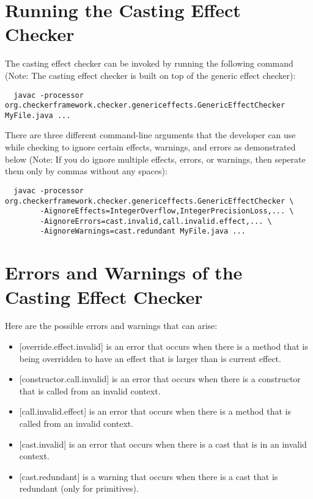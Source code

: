 \section{Running the Casting Effect Checker\label{castingeffect-running}}

The casting effect checker can be invoked by running the following command (Note: The casting effect checker is built on top of the generic effect checker):
\begin{Verbatim}
  javac -processor org.checkerframework.checker.genericeffects.GenericEffectChecker MyFile.java ...
\end{Verbatim}

There are three different command-line arguments that the developer can use while checking to ignore certain effects, warnings, and errors as demonstrated below (Note: If you do ignore multiple effects, errors, or warnings, then seperate them only by commas without any spaces):
\begin{Verbatim}
  javac -processor org.checkerframework.checker.genericeffects.GenericEffectChecker \
        -AignoreEffects=IntegerOverflow,IntegerPrecisionLoss,... \
        -AignoreErrors=cast.invalid,call.invalid.effect,... \
        -AignoreWarnings=cast.redundant MyFile.java ...
\end{Verbatim}

\section{Errors and Warnings of the Casting Effect Checker\label{castingeffect-errors}}

Here are the possible errors and warnings that can arise:
\begin{itemize}
\item
{[override.effect.invalid]} is an error that occurs when there is a method that is being overridden to have an effect that is larger than is current effect.
\item
{[constructor.call.invalid]} is an error that occurs when there is a constructor that is called from an invalid context.
\item
{[call.invalid.effect]} is an error that occurs when there is a method that is called from an invalid context.
\item
{[cast.invalid]} is an error that occurs when there is a cast that is in an invalid context.
\item
{[cast.redundant]} is a warning that occurs when there is a cast that is redundant (only for primitives).
\end{itemize}

